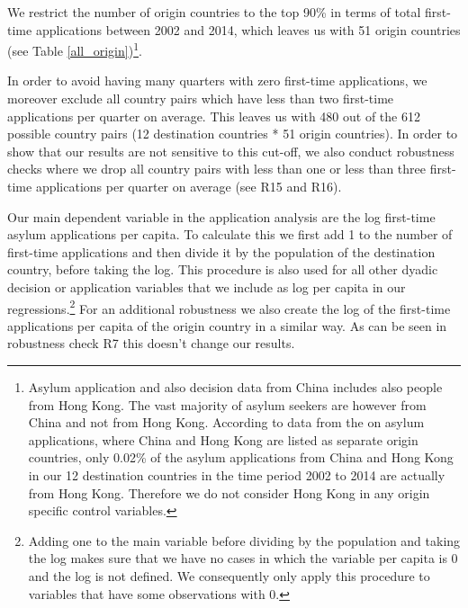 \documentclass[11pt,a4paper]{scrartcl}
\begin{document}
We restrict the number of origin countries to the top 90\% in terms of total first-time applications between 2002 and 2014, which leaves us with 51 origin countries (see Table \ref{all_origin})\footnote{Asylum application and also decision data from China includes also people from Hong Kong. The vast majority of asylum seekers are however from China and not from Hong Kong. According to data from the \textcite{UNHCR2017} on asylum applications, where China and Hong Kong are listed as separate origin countries, only 0.02\% of the asylum applications from China and Hong Kong in our 12 destination countries in the time period 2002 to 2014 are actually from Hong Kong. Therefore we do not consider Hong Kong in any origin specific control variables.}. 

In order to avoid having many quarters with zero first-time applications, we moreover exclude all country pairs which have less than two first-time applications per quarter on average. This leaves us with 480 out of the 612 possible country pairs (12 destination countries * 51 origin countries). In order to show that our results are not sensitive to this cut-off, we also conduct robustness checks where we drop all country pairs with less than one or less than three first-time applications per quarter on average (see R15 and R16).

Our main dependent variable in the application analysis are the log first-time asylum applications per capita. To calculate this we first add 1 to the number of first-time applications and then divide it by the population of the destination country, before taking the log. This procedure is also used for all other dyadic decision or application variables that we include as log per capita in our regressions.\footnote{Adding one to the main variable before dividing by the population and taking the log makes sure that we have no cases in which the variable per capita is 0 and the log is not defined. We consequently only apply this procedure to variables that have some observations with 0.} For an additional robustness we also create the log of the first-time applications per capita of the origin country in a similar way. As can be seen in robustness check R7 this doesn't change our results.
\end{document}

